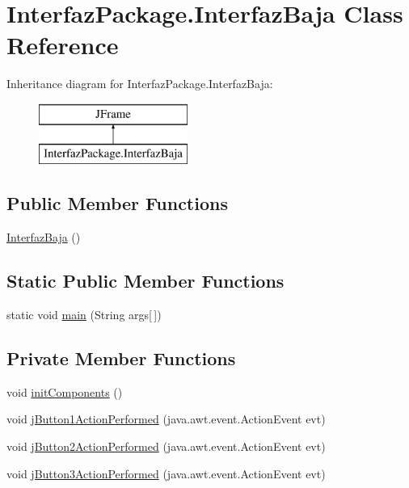 \hypertarget{class_interfaz_package_1_1_interfaz_baja}{}\section{Interfaz\+Package.\+Interfaz\+Baja Class Reference}
\label{class_interfaz_package_1_1_interfaz_baja}
Inheritance diagram for Interfaz\+Package.\+Interfaz\+Baja\+:\begin{figure}[H]
\begin{center}
\leavevmode
\includegraphics[height=2.000000cm]{class_interfaz_package_1_1_interfaz_baja}
\end{center}
\end{figure}
\subsection*{Public Member Functions}
\begin{DoxyCompactItemize}
\item 
\mbox{\hyperlink{class_interfaz_package_1_1_interfaz_baja_a27932d334092f5a28a7cd3124c5e0ec1}{Interfaz\+Baja}} ()
\end{DoxyCompactItemize}
\subsection*{Static Public Member Functions}
\begin{DoxyCompactItemize}
\item 
static void \mbox{\hyperlink{class_interfaz_package_1_1_interfaz_baja_ae62b4b45f031099df42c18284921433e}{main}} (String args\mbox{[}$\,$\mbox{]})
\end{DoxyCompactItemize}
\subsection*{Private Member Functions}
\begin{DoxyCompactItemize}
\item 
void \mbox{\hyperlink{class_interfaz_package_1_1_interfaz_baja_a86efb81f258954491bbcd72b292d2b3b}{init\+Components}} ()
\item 
void \mbox{\hyperlink{class_interfaz_package_1_1_interfaz_baja_a7e419e5352b3abfcf7466743857e6311}{j\+Button1\+Action\+Performed}} (java.\+awt.\+event.\+Action\+Event evt)
\item 
void \mbox{\hyperlink{class_interfaz_package_1_1_interfaz_baja_a940a0e0837cd07847853eff8fa207834}{j\+Button2\+Action\+Performed}} (java.\+awt.\+event.\+Action\+Event evt)
\item 
void \mbox{\hyperlink{class_interfaz_package_1_1_interfaz_baja_adfecaa97fbf001fd74893adda16c8d9b}{j\+Button3\+Action\+Performed}} (java.\+awt.\+event.\+Action\+Event evt)
\end{DoxyCompactItemize}
